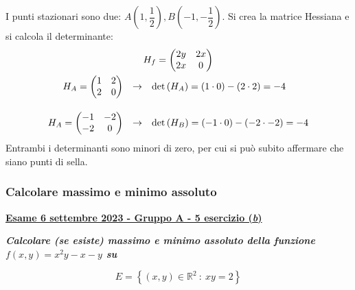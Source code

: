 \documentclass[a4paper]{article}
\makeatletter
\newcommand{\definition}[1]{\textcolor{Red3}{\textbf{#1}}}
\newcommand{\example}[1]{\textcolor{Green4}{\textbf{#1}}}
\newenvironment{rowequmat}[1]{\left(\array{@{}#1@{}}}{\endarray\right)}
\makeatother
\begin{document}
	I punti stazionari sono due: $A\left(1, \dfrac{1}{2}\right), B\left(-1, -\dfrac{1}{2}\right)$. Si crea la matrice Hessiana e si calcola il determinante:
	\begin{gather*}
		H_{f} = \begin{rowequmat}{c c}
			2y & 2x \\
			2x & 0
		\end{rowequmat}
		\\
		\begin{array}{rcl}
			H_{A} = \begin{rowequmat}{c c}
				1 & 2 \\
				2 & 0
			\end{rowequmat} & \rightarrow & \det\left(H_{A}\right) = \left(1 \cdot 0\right) - \left(2 \cdot 2\right) = -4 \\ [2em]
			H_{A} = \begin{rowequmat}{c c}
				-1 & -2 \\
				-2 &  0
			\end{rowequmat} & \rightarrow & \det\left(H_{B}\right) = \left(-1 \cdot 0\right) - \left(-2 \cdot -2\right) = -4
		\end{array}
	\end{gather*}
	Entrambi i determinanti sono minori di zero, per cui si può subito affermare che siano punti di sella.

	\newpage

	\subsubsection{Calcolare massimo e minimo assoluto}

	\begin{flushleft}
		\label{exam: esame 06 settembre 2023 - Gruppo A - 5 esercizio (b)}
		\hypertarget{
			exam: esame 06 settembre 2023 - Gruppo A - 5 esercizio (b)
		}{
			\definition{\underline{Esame 6 settembre 2023 - Gruppo A - 5 esercizio (\emph{b})}}
		}
	\end{flushleft}
	\example{\emph{Calcolare (se esiste) massimo e minimo assoluto della funzione $f\left(x,y\right) = x^{2}y - x -y$ su}}
	
	\example{\begin{equation*}
		E = \left\{\left(x,y\right) \in \mathbb{R}^{2} \: : \: xy = 2\right\}
	\end{equation*}}
\end{document}
